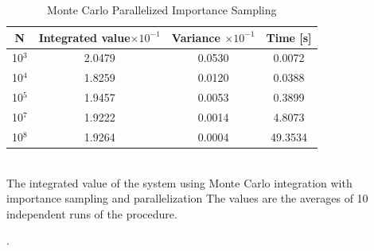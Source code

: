 \documentclass[%
reprint,
amsmath,amssymb,
aps,
]{revtex4-1}
\begin{document}
\begin{table}[!h]
	\caption{Monte Carlo Parallelized Importance Sampling }
	\begin{tabular}{|c|c|c|c|}
		\hline 
		\hspace{5mm} \textbf{N} \hspace{5mm} & \textbf{Integrated value}$\times 10^{-1}$ & \hspace{3mm} \textbf{Variance} $\times 10^{-1}$ & \hspace{3mm} \textbf{Time  [s]} \hspace{5mm}\\
		\hline 
			10$^3$ & 2.0479  & 0.0530  & 0.0072 \\
			10$^4$ & 1.8259  & 0.0120  & 0.0388 \\
			10$^5$ & 1.9457  & 0.0053  & 0.3899 \\
			10$^7$ & 1.9222  & 0.0014  & 4.8073 \\
			10$^8$ & 1.9264  & 0.0004  & 49.3534 \\
		\hline 
	\end{tabular} \\ [3pt]
	\label{mc_values_par} \centering The integrated value of the system using Monte Carlo integration with importance sampling and parallelization The values are the averages of 10 independent runs of the procedure.
\end{table}

\newpage. \newpage
\end{document}
